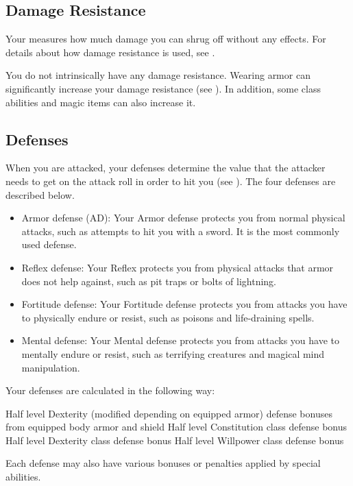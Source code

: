     \subsection{Damage Resistance}\label{Damage Resistance}
        Your  measures how much damage you can shrug off without any effects.
        For details about how damage resistance is used, see .

        You do not intrinsically have any damage resistance.
        Wearing armor can significantly increase your damage resistance (see ).
        In addition, some class abilities and magic items can also increase it.

    \subsection{Defenses}\label{Defenses}
        When you are attacked, your defenses determine the value that the attacker needs to get on the attack roll in order to hit you (see ).
        The four defenses are described below.
        \begin{itemize}
            \item Armor defense (AD): Your Armor defense protects you from normal physical attacks, such as attempts to hit you with a sword.
                It is the most commonly used defense.
            \item Reflex defense: Your Reflex protects you from physical attacks that armor does not help against, such as pit traps or bolts of lightning.
            \item Fortitude defense: Your Fortitude defense protects you from attacks you have to physically endure or resist, such as poisons and life-draining spells.
            \item Mental defense: Your Mental defense protects you from attacks you have to mentally endure or resist, such as terrifying creatures and magical mind manipulation.
        \end{itemize}

        Your defenses are calculated in the following way:
        \begin{itemize}
             Half level \add Dexterity (modified depending on equipped armor) \add defense bonuses from equipped body armor and shield
             Half level \add Constitution \add class defense bonus
             Half level \add Dexterity \add class defense bonus
             Half level \add Willpower \add class defense bonus
        \end{itemize}
        Each defense may also have various bonuses or penalties applied by special abilities.

